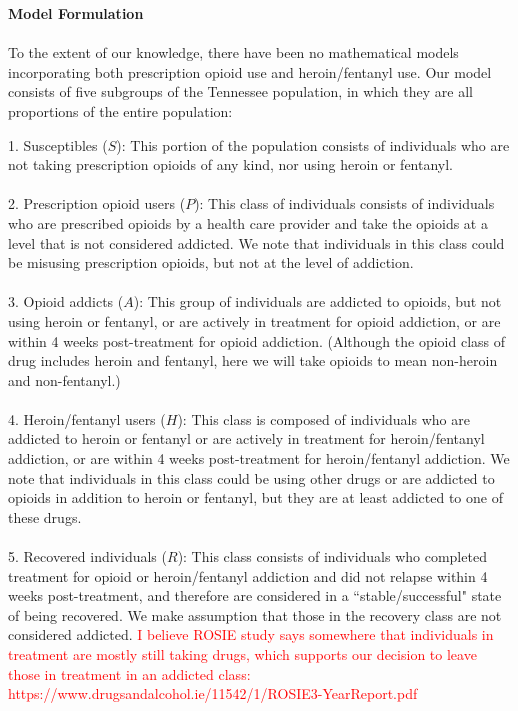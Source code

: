 \documentclass[12pt]{article}
\begin{document}
\textbf{Model Formulation} \\ \\
To the extent of our knowledge, there have been no mathematical models incorporating both prescription opioid use and heroin/fentanyl use. Our model consists of five subgroups of the Tennessee population, in which they are all proportions of the entire population: 

1. Susceptibles ($S$): This portion of the population consists of individuals who are not taking prescription opioids of any kind, nor using heroin or fentanyl. \\ \\
2. Prescription opioid users ($P$): This class of individuals consists of individuals who are prescribed opioids by a health care provider and take the opioids at a level that is not considered addicted. We note that individuals in this class could be misusing prescription opioids, but not at the level of addiction.  \\ \\ %
3. Opioid addicts ($A$): This group of individuals are addicted to opioids, but not using heroin or fentanyl, or are actively in treatment for opioid addiction, or are within 4 weeks post-treatment for opioid addiction. (Although the opioid class of drug includes heroin and fentanyl, here we will take opioids to mean non-heroin and non-fentanyl.) \\ \\
4. Heroin/fentanyl users ($H$): This class is composed of individuals who are addicted to heroin or fentanyl or are actively in treatment for heroin/fentanyl addiction, or are within 4 weeks post-treatment for heroin/fentanyl addiction. We note that individuals in this class could be using other drugs or are addicted to opioids in addition to heroin or fentanyl, but they are at least addicted to one of these drugs. \\ \\
5. Recovered individuals ($R$): This class consists of individuals who completed treatment for opioid or heroin/fentanyl addiction and did not relapse within 4 weeks post-treatment, and therefore are considered in a ``stable/successful" state of being recovered. We make assumption that those in the recovery class are not considered addicted. \textcolor{red}{I believe ROSIE study says somewhere that individuals in treatment are mostly still taking drugs, which supports our decision to leave those in treatment in an addicted class: https://www.drugsandalcohol.ie/11542/1/ROSIE3-YearReport.pdf} \\
\end{document}
